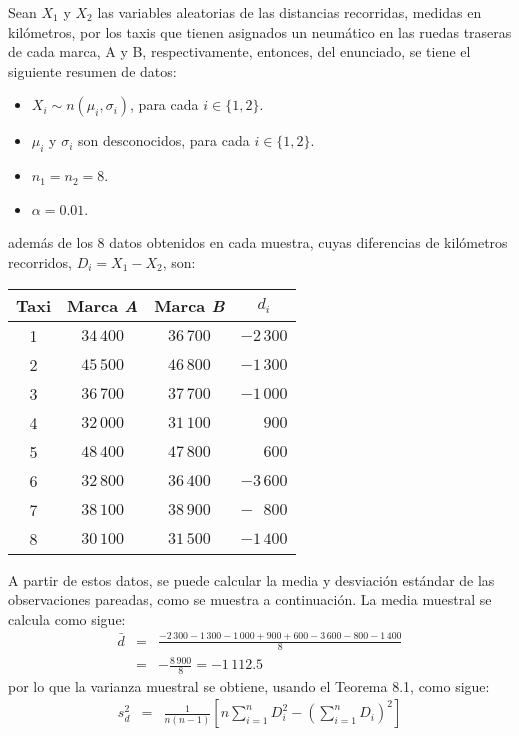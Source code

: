 \begin{solucion}
 Sean $X_1$ y $X_2$ las variables aleatorias de las distancias recorridas, medidas en kil\'ometros, por los taxis que tienen asignados un neum\'atico en las ruedas traseras de cada marca, A y B, respectivamente, entonces, del enunciado, se tiene el siguiente resumen de datos:
 \begin{itemize}
  \item $X_i \sim n\left( \mu_i, \sigma_i \right)$, para cada $i \in \{ 1, 2 \}$.
  \item $\mu_i$ y $\sigma_i$ son desconocidos, para cada $i \in \{ 1, 2 \}$.
  \item $n_1 = n_2 = 8$.
  \item $\alpha = 0.01$.
 \end{itemize}
 adem\'as de los $8$ datos obtenidos en cada muestra, cuyas diferencias de kil\'ometros recorridos, $D_i = X_1 - X_2$, son:
 \begin{center}
  \begin{tabular}{cccc}
   \textbf{Taxi} & \textbf{Marca \textit{A}} & \textbf{Marca \textit{B}} & $d_i$ \\
   \hline 
   1 & $34\,400$ & $36\,700$ & $-2\,300$ \\
   2 & $45\,500$ & $46\,800$ & $-1\,300$ \\
   3 & $36\,700$ & $37\,700$ & $-1\,000$ \\
   4 & $32\,000$ & $31\,100$ & $\phantom{-1}\,900$ \\
   5 & $48\,400$ & $47\,800$ & $\phantom{-1}\,600$ \\
   6 & $32\,800$ & $36\,400$ & $-3\,600$ \\
   7 & $38\,100$ & $38\,900$ & $-\phantom{1}\,800$ \\
   8 & $30\,100$ & $31\,500$ & $-1\,400$
  \end{tabular}
 \end{center}
 A partir de estos datos, se puede calcular la media y desviaci\'on est\'andar de las observaciones pareadas, como se muestra a continuaci\'on. La media muestral se calcula como sigue:
 \begin{eqnarray*}
  \bar{d} & = & \frac{-2\,300  -1\,300 -1\,000 + 900 + 600 - 3\,600 - 800 - 1\,400}{8} \\
  & = & -\frac{8\,900}{8} = -1\,112.5
 \end{eqnarray*}
 por lo que la varianza muestral se obtiene, usando el Teorema 8.1, como sigue:
 \begin{eqnarray*}
  s_d^2 & = & \frac{1}{n(n-1)}\left[ n \sum_{i=1}^n D_i^2 - \left( \sum_{i=1}^n D_i \right)^2 \right] \\

\end{eqnarray*}
\end{solucion}

